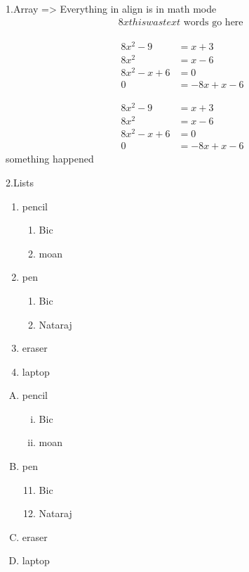 \documentclass{article}
\begin{document}
	
	1.Array
	=> Everything in align is in math mode
	\begin{align}
		8x  this was text \text{ words go here }
	\end{align}
	
	\begin{align}
		8x^2-9&=x+3\\
		8x^2&=x-6\\
		8x^2-x+6&=0\\
		0&=-8x+x-6
	\end{align}
	
		\begin{align*}
		8x^2-9&=x+3\\
		8x^2&=x-6\\
		8x^2-x+6&=0\\
		0&=-8x+x-6
	\end{align*}
	something happened
	
	2.Lists
	\begin{enumerate}
		\item pencil
			\begin{enumerate}
				\item Bic
				\item moan
			\end{enumerate}
		\item pen
		\begin{enumerate}
			\item Bic
			\item Nataraj
		\end{enumerate}
		\item eraser
		\item laptop
		
	\end{enumerate}
	
	\vspace{2cm}
	\begin{enumerate}[A.]
		\item pencil
		\begin{enumerate}[i.]
			\item Bic
			\item moan
		\end{enumerate}
		\item pen
		\begin{enumerate}\setcounter{enumi}{10}
			\item Bic
			\item Nataraj
		\end{enumerate}
		\item eraser
		\item laptop
		
	\end{enumerate}
	
\end{document}
